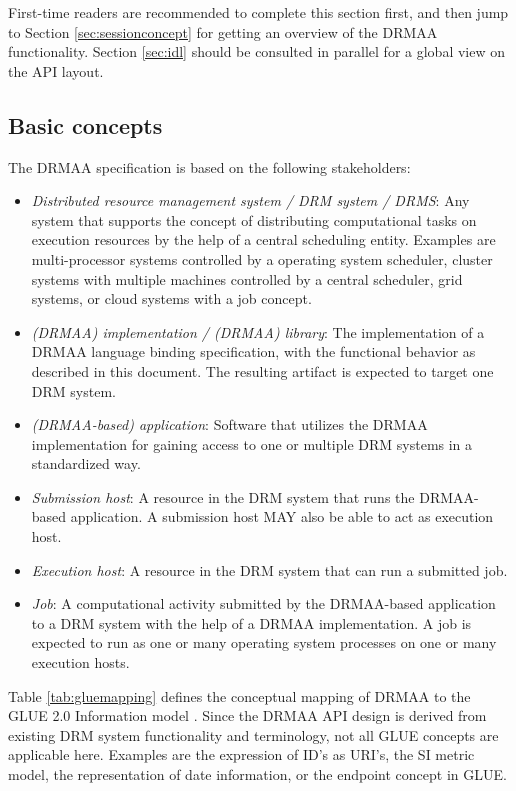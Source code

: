 \documentclass{article}
\begin{document}
First-time readers are recommended to complete this section first, and then jump to Section \ref{sec:sessionconcept} for getting an overview of the DRMAA functionality. Section \ref{sec:idl} should be consulted in parallel for a global view on the API layout.

\subsection{Basic concepts}
\label{sec:concepts}

The DRMAA specification is based on the following stakeholders:

\begin{itemize}
	\item \emph{Distributed resource management system / DRM system / DRMS}: Any system that supports the concept of distributing computational tasks on execution resources by the help of a central scheduling entity. Examples are multi-processor systems controlled by a operating system scheduler, cluster systems with multiple machines controlled by a central scheduler, grid systems, or cloud systems with a job concept.  
	\item \emph{(DRMAA) implementation / (DRMAA) library}: The implementation of a DRMAA language binding specification, with the functional behavior as described in this document. The resulting artifact is expected to target one DRM system. 
	\item \emph{(DRMAA-based) application}: Software that utilizes the DRMAA implementation for gaining access to one or multiple DRM systems in a standardized way.  
	\item \emph{Submission host}: A resource in the DRM system that runs the DRMAA-based application. A submission host MAY also be able to act as execution host.
	\item \emph{Execution host}: A resource in the DRM system that can run a submitted job. 
	\item \emph{Job}: A computational activity submitted by the DRMAA-based application to a DRM system with the help of a DRMAA implementation. A job is expected to run as one or many operating system processes on one or many execution hosts. 
\end{itemize}

Table \ref{tab:gluemapping} defines the conceptual mapping of DRMAA to the GLUE 2.0 Information model \cite{gfd.147}. Since the DRMAA API design is derived from existing DRM system functionality and terminology, not all GLUE concepts are applicable here. Examples are the expression of ID's as URI's, the SI metric model, the representation of date information, or the endpoint concept in GLUE.
\end{document}
